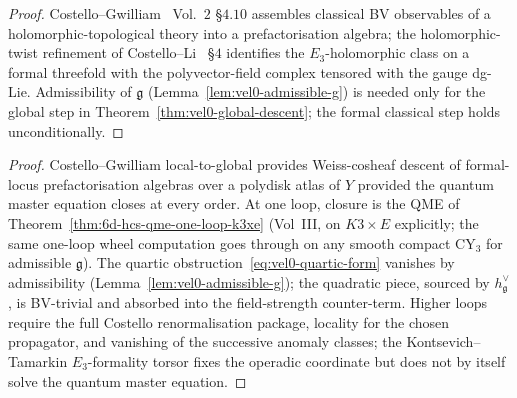 \begin{proof}
Costello--Gwilliam~\cite{CostelloGwilliam} Vol.~$2$ \S$4.10$ assembles
classical BV observables of a holomorphic-topological theory into a
prefactorisation algebra; the holomorphic-twist refinement of
Costello--Li~\cite{CostelloLi2020} \S$4$ identifies the
$E_3$-holomorphic class on a formal threefold with the polyvector-field
complex tensored with the gauge dg-Lie. Admissibility of $\mathfrak g$
\textup{(}Lemma~\ref{lem:vel0-admissible-g}\textup{)} is needed only
for the global step in
Theorem~\ref{thm:vel0-global-descent}; the formal classical step holds
unconditionally.
\end{proof}


\begin{proof}
Costello--Gwilliam local-to-global \cite{CG21} provides Weiss-cosheaf
descent of formal-locus prefactorisation algebras over a polydisk
atlas of $Y$ provided the quantum master equation closes at every
order. At one loop, closure is the QME of
Theorem~\ref{thm:6d-hcs-qme-one-loop-k3xe} (Vol~III, on $K3 \times E$
explicitly; the same one-loop wheel computation goes through on any
smooth compact $\mathrm{CY}_3$ for admissible $\mathfrak{g}$). The
quartic obstruction~\eqref{eq:vel0-quartic-form} vanishes by
admissibility \textup{(}Lemma~\ref{lem:vel0-admissible-g}\textup{);} the
quadratic piece, sourced by $h^\vee_\mathfrak{g}$, is BV-trivial and
absorbed into the field-strength counter-term. Higher loops require the
full Costello renormalisation package, locality for the chosen
propagator, and vanishing of the successive anomaly classes; the
Kontsevich--Tamarkin $E_3$-formality torsor fixes the operadic
coordinate but does not by itself solve the quantum master equation.
\end{proof}

